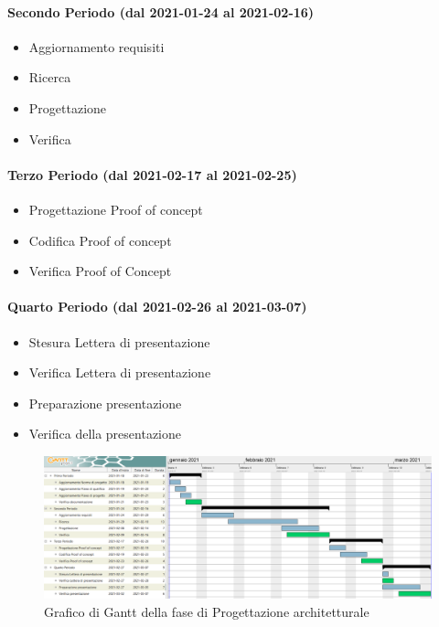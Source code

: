 \paragraph{Secondo Periodo (dal 2021-01-24 al 2021-02-16)}
\begin{itemize}
	\item Aggiornamento requisiti
	\item Ricerca
	\item Progettazione
	\item Verifica
\end{itemize}

\paragraph{Terzo Periodo (dal 2021-02-17 al 2021-02-25)}
\begin{itemize}
	\item Progettazione Proof of concept
	\item Codifica Proof of concept
	\item Verifica Proof of Concept
\end{itemize}

\paragraph{Quarto Periodo (dal 2021-02-26 al 2021-03-07)}
\begin{itemize}
	\item Stesura Lettera di presentazione
	\item Verifica Lettera di presentazione
	\item Preparazione presentazione
	\item Verifica della presentazione
\end{itemize}

\begin{landscape}
	\begin{figure}[H]
		\centering
		\includegraphics[width=\linewidth]{res/images/ganttFase2.png}
		\caption{Grafico di Gantt della fase di Progettazione architetturale}
		\label{fig:Gantt Analisi dei requisiti}
	\end{figure}
\end{landscape}

